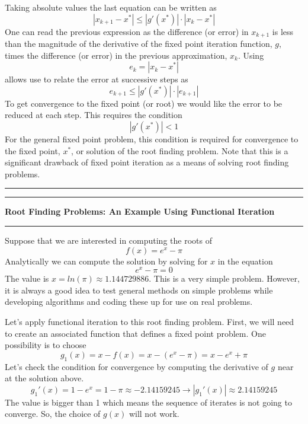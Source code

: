 \documentclass[10pt,fleqn]{article}
\begin{document}
Taking absolute values the last equation can be written as
$$
  | x_{k+1} - x^* | \leq | g'(x^*) | \cdot | x_k - x^* |
$$
One can read the previous expression as the difference (or error) in $x_{k+1}$
is less than the magnitude of the derivative of the fixed point iteration 
function, $g$, times the difference (or error) in the previous approximation,
$x_k$. Using
$$
  e_{k} = | x_k - x^* |
$$
allows use to relate the error at successive steps as
$$
  e_{k+1} \leq | g'(x^*) | \cdot | e_{k+1} |
$$
To get convergence to the fixed point (or root) we would like the error to be
reduced at each step. This requires the condition
$$
  | g'(x^*) | < 1
$$
For the general fixed point problem, this condition is required for convergence
to the fixed point, $x^*$, or solution of the root finding problem. Note that
this is a significant drawback of fixed point iteration as a means of solving
root finding problems.
\vskip0.1in\hrule\vskip0.1in
\newpage
\vskip0.1in\hrule\vskip0.1in
\noindent
{\bf Root Finding Problems: An Example Using Functional Iteration} 
\vskip0.1in\hrule\vskip0.1in
\noindent
Suppose that we are interested in computing the roots of
$$
  f(x) = e^x - \pi
$$
Analytically we can compute the solution by solving for $x$ in the equation
$$
  e^x - \pi = 0
$$
The value is $x=ln(\pi)\approx 1.144729886$. This is a very simple problem.
However, it is always a good idea to test general methods on simple problems
while developing algorithms and coding these up for use on real problems.

Let's apply functional iteration to this root finding problem. First, we will
need to create an associated function that defines a fixed point problem. One
possibility is to choose
$$
  g_1(x) = x - f(x) = x - ( e^x - \pi ) = x - e^x + \pi
$$
Let's check the condition for convergence by computing the derivative of $g$
near at the solution above.
$$
  g_1'(x) = 1 - e^x = 1 - \pi \approx -2.14159245 \rightarrow 
  | g_1'(x) | \approx 2.14159245
$$
The value is bigger than 1 which means the sequence of iterates is not going to
converge. So, the choice of $g(x)$ will not work.
\end{document}
